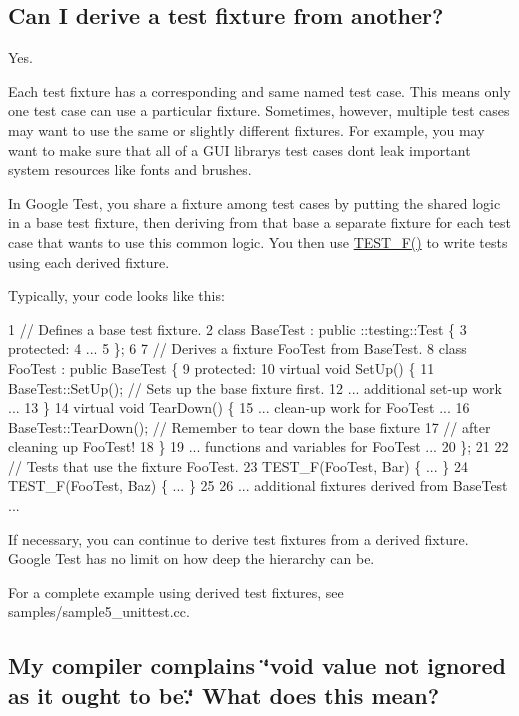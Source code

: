 \subsection*{Can I derive a test fixture from another?}

Yes.

Each test fixture has a corresponding and same named test case. This means only one test case can use a particular fixture. Sometimes, however, multiple test cases may want to use the same or slightly different fixtures. For example, you may want to make sure that all of a G\+UI library\textquotesingle{}s test cases don\textquotesingle{}t leak important system resources like fonts and brushes.

In Google Test, you share a fixture among test cases by putting the shared logic in a base test fixture, then deriving from that base a separate fixture for each test case that wants to use this common logic. You then use {\ttfamily \hyperlink{gtest_8h_a0ee66d464d1a06c20c1929cae09d8758}{T\+E\+S\+T\+\_\+\+F()}} to write tests using each derived fixture.

Typically, your code looks like this\+:


\begin{DoxyCode}
1 // Defines a base test fixture.
2 class BaseTest : public ::testing::Test \{
3   protected:
4    ...
5 \};
6 
7 // Derives a fixture FooTest from BaseTest.
8 class FooTest : public BaseTest \{
9   protected:
10     virtual void SetUp() \{
11       BaseTest::SetUp();  // Sets up the base fixture first.
12       ... additional set-up work ...
13     \}
14     virtual void TearDown() \{
15       ... clean-up work for FooTest ...
16       BaseTest::TearDown();  // Remember to tear down the base fixture
17                              // after cleaning up FooTest!
18     \}
19     ... functions and variables for FooTest ...
20 \};
21 
22 // Tests that use the fixture FooTest.
23 TEST\_F(FooTest, Bar) \{ ... \}
24 TEST\_F(FooTest, Baz) \{ ... \}
25 
26 ... additional fixtures derived from BaseTest ...
\end{DoxyCode}


If necessary, you can continue to derive test fixtures from a derived fixture. Google Test has no limit on how deep the hierarchy can be.

For a complete example using derived test fixtures, see {\ttfamily samples/sample5\+\_\+unittest.\+cc}.

\subsection*{My compiler complains \char`\"{}void value not ignored as it ought to be.\char`\"{} What does this mean?}

